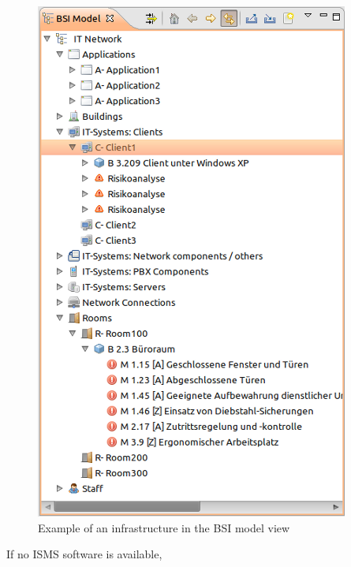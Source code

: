 \documentclass[a4paper,10pt]{book}
\begin{document}
\begin{figure}[htb!]
  \centering
  \includegraphics[scale=.4]{Screenshot/GS_Modell_Baumstruktur-en.png}
  \caption{\label{Example of an ifrastructure in the BSI model view} Example of an infrastructure in the BSI model view}
\end{figure}
If no ISMS software is available,
\end{document}
